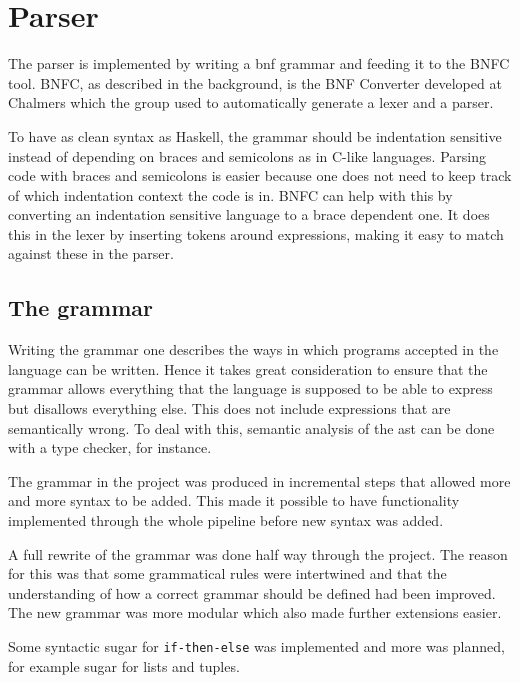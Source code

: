 \section{Parser}

The parser is implemented by writing a \gls{bnf} grammar and feeding it to the BNFC \cite{bnfc} tool. BNFC, as described in the background, is the BNF Converter developed at Chalmers which the group used to automatically generate a lexer and a parser.

To have as clean syntax as Haskell, the grammar should be indentation sensitive instead of depending on braces and semicolons as in C-like languages. Parsing code with braces and semicolons is easier because one does not need to keep track of which indentation context the code is in. BNFC can help with this by converting an indentation sensitive language to a brace dependent one. It does this in the lexer by inserting tokens around expressions, making it easy to match against these in the parser.

\subsection{The grammar}

Writing the grammar one describes the ways in which programs accepted in the language can be written. Hence it takes great consideration to ensure that the grammar allows everything that the language is supposed to be able to express but disallows everything else. This does not include expressions that are semantically wrong. To deal with this, semantic analysis of the \gls{ast} can be done with a type checker, for instance. 

The grammar in the project was produced in incremental steps that allowed more and more syntax to be added. This made it possible to have functionality implemented through the whole pipeline before new syntax was added. 

A full rewrite of the grammar was done half way through the project. The reason for this was that some grammatical rules were intertwined and that the understanding of how a correct grammar should be defined had been improved. The new grammar was more modular which also made further extensions easier.

Some syntactic sugar for \texttt{if-then-else} was implemented and more was planned, for example sugar for lists and tuples.
